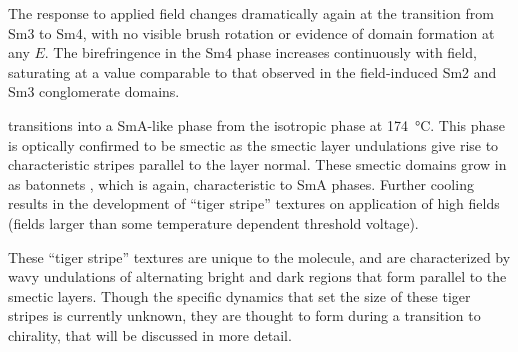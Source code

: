 The response to applied field changes dramatically again at
the transition from Sm3 to Sm4, with no visible brush rotation or evidence of domain formation at any $E$. The birefringence in the Sm4 phase increases continuously with field, saturating
at a value comparable to that observed in the field-induced Sm2 and Sm3 conglomerate domains.

 transitions into a SmA-like phase from the isotropic phase at
\SI{174}{\degreeCelsius}. This phase is optically confirmed to be smectic as
the smectic layer undulations give rise to characteristic stripes parallel
to the layer normal. These smectic domains grow in as batonnets ,
 which is again, characteristic to SmA phases. Further cooling results in
 the development of ``tiger stripe'' textures on application of high fields
 (fields larger than some temperature dependent threshold voltage).

 These ``tiger stripe'' textures are unique to the  molecule, and
 are characterized by wavy undulations of alternating bright and dark
 regions that form parallel to the smectic layers. Though the specific
 dynamics that set the size of these tiger stripes is currently unknown,
 they are thought to form during a transition to chirality, that will be
 discussed in more detail.


